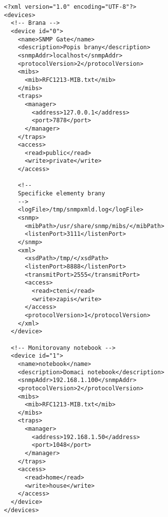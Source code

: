 \begin{verbatim}
<?xml version="1.0" encoding="UTF-8"?>
<devices>
  <!-- Brana -->
  <device id="0">
    <name>SNMP Gate</name>
    <description>Popis brany</description>
    <snmpAddr>localhost</snmpAddr>
    <protocolVersion>2</protocolVersion>
    <mibs>
      <mib>RFC1213-MIB.txt</mib>
    </mibs>
    <traps>
      <manager>
        <address>127.0.0.1</address>
        <port>7878</port>
      </manager>
    </traps>
    <access>
      <read>public</read>
      <write>private</write>
    </access>

    <!--
    Specificke elementy brany
    -->
    <logFile>/tmp/snmpxmld.log</logFile>
    <snmp>
      <mibPath>/usr/share/snmp/mibs/</mibPath>
      <listenPort>3111</listenPort>
    </snmp>
    <xml>
      <xsdPath>/tmp/</xsdPath>
      <listenPort>8888</listenPort>
      <transmitPort>2555</transmitPort>
      <access>
        <read>cteni</read>
        <write>zapis</write>
      </access>
      <protocolVersion>1</protocolVersion>
    </xml>
  </device>

  <!-- Monitorovany notebook -->
  <device id="1">
    <name>notebook</name>
    <description>Domaci notebook</description>
    <snmpAddr>192.168.1.100</snmpAddr>
    <protocolVersion>2</protocolVersion>
    <mibs>
      <mib>RFC1213-MIB.txt</mib>
    </mibs>
    <traps>
      <manager>
        <address>192.168.1.50</address>
        <port>1048</port>
      </manager>
    </traps>
    <access>
      <read>home</read>
      <write>house</write>
    </access>
  </device>
</devices>
\end{verbatim}

